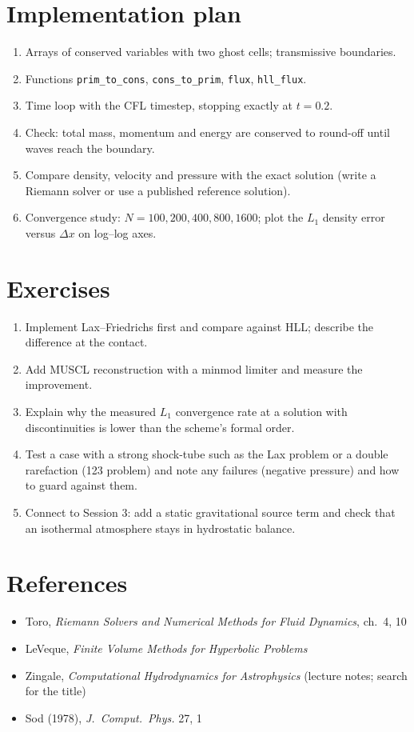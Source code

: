 \section{Implementation plan}
\begin{enumerate}
\item Arrays of conserved variables with two ghost cells; transmissive boundaries.
\item Functions \texttt{prim\_to\_cons}, \texttt{cons\_to\_prim}, \texttt{flux}, \texttt{hll\_flux}.
\item Time loop with the CFL timestep, stopping exactly at $t=0.2$.
\item Check: total mass, momentum and energy are conserved to round-off until waves reach the boundary.
\item Compare density, velocity and pressure with the exact solution (write a Riemann solver or use a published reference solution).
\item Convergence study: $N=100,200,400,800,1600$; plot the $L_1$ density error versus $\Delta x$ on log--log axes.
\end{enumerate}

\section{Exercises}
\begin{enumerate}
\item Implement Lax--Friedrichs first and compare against HLL; describe the difference at the contact.
\item Add MUSCL reconstruction with a minmod limiter and measure the improvement.
\item Explain why the measured $L_1$ convergence rate at a solution with discontinuities is lower than the scheme's formal order.
\item Test a case with a strong shock-tube such as the Lax problem or a double rarefaction (123 problem) and note any failures (negative pressure) and how to guard against them.
\item Connect to Session 3: add a static gravitational source term and check that an isothermal atmosphere stays in hydrostatic balance.
\end{enumerate}

\section*{References}
\begin{itemize}
\item Toro, \textit{Riemann Solvers and Numerical Methods for Fluid Dynamics}, ch.\ 4, 10
\item LeVeque, \textit{Finite Volume Methods for Hyperbolic Problems}
\item Zingale, \textit{Computational Hydrodynamics for Astrophysics} (lecture notes; search for the title)
\item Sod (1978), \textit{J.\ Comput.\ Phys.} 27, 1
\end{itemize}

